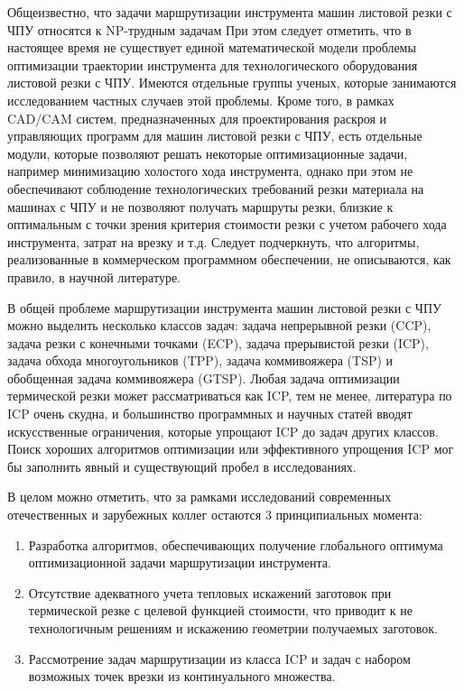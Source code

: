 \documentclass[14pt]{extarticle}
\begin{document}
Общеизвестно, 
что задачи маршрутизации инструмента машин листовой резки с ЧПУ относятся к 
NP-трудным задачам 
При этом следует отметить, что в настоящее время не существует единой математической модели 
проблемы оптимизации траектории инструмента для технологического оборудования листовой резки с ЧПУ. 
Имеются отдельные группы ученых, которые занимаются исследованием частных случаев этой проблемы. 
Кроме того, в рамках CAD/CAM систем, 
предназначенных для проектирования раскроя и управляющих программ для машин листовой резки с ЧПУ, 
есть отдельные модули, которые позволяют решать некоторые оптимизационные задачи, 
например минимизацию холостого хода инструмента, 
однако при этом не обеспечивают соблюдение технологических требований резки материала на машинах с ЧПУ 
и не позволяют получать маршруты резки, 
близкие к оптимальным с точки зрения критерия стоимости резки с учетом рабочего хода инструмента, 
затрат на врезку и т.д. 
Следует подчеркнуть, 
что алгоритмы, реализованные в коммерческом программном обеспечении, 
не описываются, как правило, в научной литературе.

В общей проблеме маршрутизации инструмента машин листовой резки с ЧПУ
можно выделить несколько классов задач: 
задача непрерывной резки (CCP), 
задача резки с конечными точками (ECP), 
задача прерывистой резки (ICP), 
задача обхода многоугольников (TPP), 
задача коммивояжера (TSP) 
и обобщенная задача коммивояжера (GTSP). 
Любая задача оптимизации термической резки может рассматриваться как ICP,
тем не менее, литература по ICP очень скудна, 
и большинство программных и научных статей вводят искусственные ограничения, 
которые упрощают ICP до задач других классов. 
Поиск хороших алгоритмов оптимизации или эффективного упрощения ICP
мог бы заполнить явный и существующий пробел в исследованиях. 

В целом можно отметить, 
что за рамками исследований современных отечественных и зарубежных коллег остаются 3 принципиальных момента:
\begin{enumerate}
    \item
    Разработка алгоритмов, обеспечивающих получение глобального оптимума 
    оптимизационной задачи маршрутизации инструмента.    
    \item
    Отсутствие адекватного учета тепловых искажений заготовок при термической резке 
    с целевой функцией стоимости, что приводит к не технологичным решениям 
    и искажению геометрии получаемых заготовок.
    \item
    Рассмотрение задач маршрутизации из класса ICP 
    и задач с набором возможных точек врезки из континуального множества.
\end{enumerate}
\end{document}

